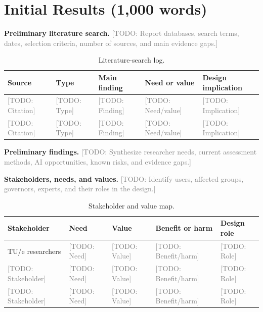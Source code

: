 \documentclass[11pt,a4paper]{article}
\newcommand{\placeholder}[1]{\textcolor{gray}{[TODO: #1]}}
\begin{document}
\section{Initial Results (1,000 words)}

\textbf{Preliminary literature search.}
\placeholder{Report databases, search terms, dates, selection criteria, number of sources, and main evidence gaps.}

\begin{table}[htbp]
\centering
\caption{Literature-search log.}
\small
\begin{tabularx}{\textwidth}{@{}p{}p{}XXp{}@{}}
\toprule
Source & Type & Main finding & Need or value & Design implication \\
\midrule
\placeholder{Citation} & \placeholder{Type} & \placeholder{Finding} & \placeholder{Need/value} & \placeholder{Implication} \\
\placeholder{Citation} & \placeholder{Type} & \placeholder{Finding} & \placeholder{Need/value} & \placeholder{Implication} \\
\bottomrule
\end{tabularx}
\end{table}

\textbf{Preliminary findings.}
\placeholder{Synthesize researcher needs, current assessment methods, AI opportunities, known risks, and evidence gaps.}

\textbf{Stakeholders, needs, and values.}
\placeholder{Identify users, affected groups, governors, experts, and their roles in the design.}

\begin{table}[htbp]
\centering
\caption{Stakeholder and value map.}
\small
\begin{tabularx}{\textwidth}{@{}p{}XXXp{}@{}}
\toprule
Stakeholder & Need & Value & Benefit or harm & Design role \\
\midrule
TU/e researchers & \placeholder{Need} & \placeholder{Value} & \placeholder{Benefit/harm} & \placeholder{Role} \\
\placeholder{Stakeholder} & \placeholder{Need} & \placeholder{Value} & \placeholder{Benefit/harm} & \placeholder{Role} \\
\placeholder{Stakeholder} & \placeholder{Need} & \placeholder{Value} & \placeholder{Benefit/harm} & \placeholder{Role} \\
\bottomrule
\end{tabularx}
\end{table}
\end{document}
